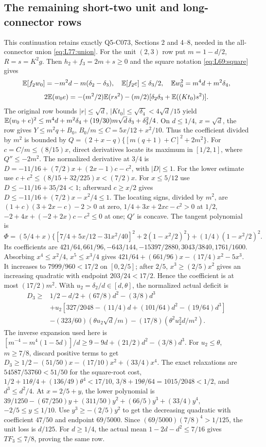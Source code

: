 \subsection{The remaining short-two unit and long-connector rows}\label{proof:Q5-C073-connectors}
This continuation retains exactly Q5-C073, Sections 2 and 4--8,
needed in the all-connector union \eqref{eq:L77:union}.
For the unit $(2,3)$ row put $m=1-d/2$, $R=s=K^2g$.
Then $h_2+f_3=2m+s\ge0$ and the square notation
\eqref{eq:L69:square} gives
\[
\mathbb E[f_2w_0]=-m^2d-m(\delta_2-\delta_3),\quad
\mathbb E[f_2e]\le\delta_3/2,\quad\mathbb E w_0^2=m^4d+m^2\delta_4,
\]
\[
2\mathbb E(w_0e)=-(m^2/2)\mathbb E(rs^2)
-(m/2)[\delta_2\delta_3+\mathbb E((Kt_0)s^2)].
\]
The original row bounds $|r|\le\sqrt d$,
$|Kt_0|\le\sqrt{\delta_4}<4\sqrt d/15$ yield
$\mathbb E(w_0+e)^2\le m^4d+m^2\delta_4
+(19/30)m\sqrt d\,\delta_3+\delta_3^2/4$.
On $d\le1/4$, $x=\sqrt d$, the row gives
$Y\le m^2q+B_0$, $B_0/m\le C=5x/12+x^2/10$.
Thus the coefficient divided by $m^2$ is bounded by
$Q=(2+x-q)\{[m(q+1)+C]^2+2m^2\}$.
For $c=C/m\le(8/15)x$, direct derivatives locate its maximum in
$[1/2,1]$, where $Q''\le-2m^2$.
The normalized derivative at $3/4$ is
$D=-11/16+(7/2)x+(2x-1)c-c^2$, with $|D|\le1$.
For the lower estimate use
$c+c^2\le(8/15+32/225)x<(7/2)x$.
For $x\le5/12$ use $D\le-11/16+35/24<1$; afterward
$c\ge x/2$ gives $D\le-11/16+(7/2)x-x^2/4\le1$.
The locating signs, divided by $m^2$, are
$(1+c)(3+2x-c)-2>0$ at zero,
$1/4+3x+2xc-c^2>0$ at $1/2$,
$-2+4x+(-2+2x)c-c^2\le0$ at one; $Q'$ is concave.
The tangent polynomial is
\[
\Phi=(5/4+x)\{[7/4+5x/12-31x^2/40]^2
+2(1-x^2/2)^2\}+(1/4)(1-x^2/2)^2.
\]
Its coefficients are
$421/64,\allowbreak 661/96,\allowbreak -643/144,\allowbreak -15397/2880,\allowbreak 3043/3840,\allowbreak 1761/1600$.
Absorbing $x^4\le x^2/4$, $x^5\le x^3/4$ gives
$421/64+(661/96)x-(17/4)x^2-5x^3$.
It increases to $7999/960<17/2$ on $[0,2/5]$; after $2/5$,
$x^3\ge(2/5)x^2$ gives an increasing quadratic with endpoint
$203/24<17/2$. Hence the coefficient is at most $(17/2)m^2$.
With $u_2=\delta_2/d\in[d,\theta]$, the normalized actual deficit is
\begin{align*}
D_3\ge{}&1/2-d/2+(67/8)d^2-(3/8)d^3\\
&+u_2[327/2048-(11/4)d+(101/64)d^2-(19/64)d^3]\\
&-(323/60)(\theta u_2\sqrt d/m)
-(17/8)(\theta^2u_2^2d/m^2).
\end{align*}
The inverse expansion used here is
$[m^{-4}-m^4(1-5d)]/d\ge9-9d+(21/2)d^2-(3/8)d^3$.
For $u_2\le\theta$, $m\ge7/8$, discard positive terms to get
$D_3\ge1/2-(51/50)x-(17/10)x^2+(33/4)x^4$.
The exact relaxations are
$54587/53760<51/50$ for the square-root cost,
$1/2+11\theta/4+(136/49)\theta^4<17/10$,
$3/8+19\theta/64=1015/2048<1/2$, and $d^3\le d^2/4$.
At $x=2/5+y$, the lower polynomial is
$39/1250-(67/250)y+(311/50)y^2+(66/5)y^3+(33/4)y^4$,
$-2/5\le y\le1/10$.
Use $y^3\ge-(2/5)y^2$ to get the decreasing quadratic with
coefficient $47/50$ and endpoint $69/5000$.
Since $(69/5000)(7/8)^4>1/125$, the unit loss is $d/125$.
For $d\ge1/4$, the actual mean $1-2d-d^2\le7/16$ gives
$TF_3\le7/8$, proving the same row.

